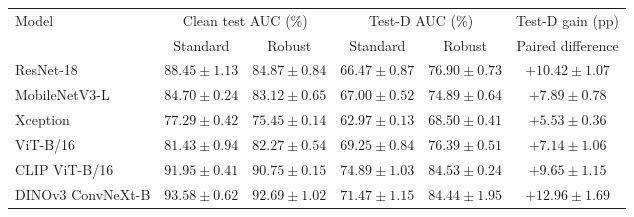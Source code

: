 \begin{tabular}{lccccc}
\toprule
Model & \multicolumn{2}{c}{Clean test AUC (\%)} & \multicolumn{2}{c}{Test-D AUC (\%)} & Test-D gain (pp) \\
\cmidrule(lr){2-3}\cmidrule(lr){4-5}
 & Standard & Robust & Standard & Robust & Paired difference \\
\midrule
ResNet-18 & $88.45 \pm 1.13$ & $84.87 \pm 0.84$ & $66.47 \pm 0.87$ & $76.90 \pm 0.73$ & $+10.42 \pm 1.07$ \\
MobileNetV3-L & $84.70 \pm 0.24$ & $83.12 \pm 0.65$ & $67.00 \pm 0.52$ & $74.89 \pm 0.64$ & $+7.89 \pm 0.78$ \\
Xception & $77.29 \pm 0.42$ & $75.45 \pm 0.14$ & $62.97 \pm 0.13$ & $68.50 \pm 0.41$ & $+5.53 \pm 0.36$ \\
ViT-B/16 & $81.43 \pm 0.94$ & $82.27 \pm 0.54$ & $69.25 \pm 0.84$ & $76.39 \pm 0.51$ & $+7.14 \pm 1.06$ \\
CLIP ViT-B/16 & $91.95 \pm 0.41$ & $90.75 \pm 0.15$ & $74.89 \pm 1.03$ & $84.53 \pm 0.24$ & $+9.65 \pm 1.15$ \\
DINOv3 ConvNeXt-B & $93.58 \pm 0.62$ & $92.69 \pm 1.02$ & $71.47 \pm 1.15$ & $84.44 \pm 1.95$ & $+12.96 \pm 1.69$ \\
\bottomrule
\end{tabular}
